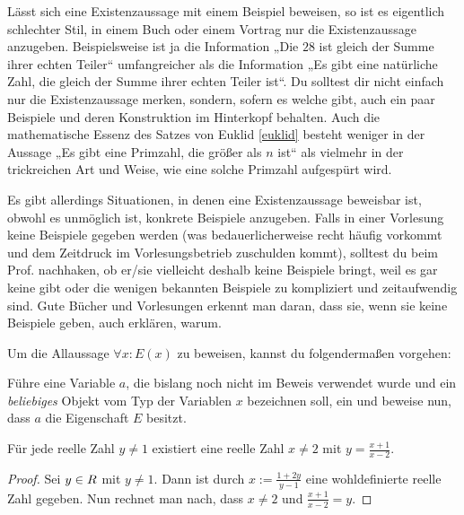   
\begin{bem}
    Lässt sich eine Existenzaussage mit einem Beispiel beweisen, so ist es eigentlich schlechter Stil, in einem Buch oder einem Vortrag nur die Existenzaussage anzugeben. Beispielsweise ist ja die Information „Die $28$ ist gleich der Summe ihrer echten Teiler“ umfangreicher als die Information „Es gibt eine natürliche Zahl, die gleich der Summe ihrer echten Teiler ist“. Du solltest dir nicht einfach nur die Existenzaussage merken, sondern, sofern es welche gibt, auch ein paar Beispiele und deren Konstruktion im Hinterkopf behalten. Auch die mathematische Essenz des Satzes von Euklid \cref{euklid} besteht weniger in der Aussage „Es gibt eine Primzahl, die größer als $n$ ist“ als vielmehr in der trickreichen Art und Weise, wie eine solche Primzahl aufgespürt wird.
    
    Es gibt allerdings Situationen, in denen eine Existenzaussage beweisbar ist, obwohl es unmöglich ist, konkrete Beispiele anzugeben. Falls in einer Vorlesung keine Beispiele gegeben werden (was bedauerlicherweise recht häufig vorkommt und dem Zeitdruck im Vorlesungsbetrieb zuschulden kommt), solltest du beim Prof. nachhaken, ob er/sie vielleicht deshalb keine Beispiele bringt, weil es gar keine gibt oder die wenigen bekannten Beispiele zu kompliziert und zeitaufwendig sind. Gute Bücher und Vorlesungen erkennt man daran, dass sie, wenn sie keine Beispiele geben, auch erklären, warum.
\end{bem}


\begin{axiom}\label{allbeweis} 
    Um die Allaussage $\forall x: E(x)$ zu beweisen, kannst du folgendermaßen vorgehen:
    
    Führe eine Variable $a$, die bislang noch nicht im Beweis verwendet wurde und ein \emph{beliebiges} Objekt vom Typ der Variablen $x$ bezeichnen soll, ein und beweise nun, dass $a$ die Eigenschaft $E$ besitzt.
\end{axiom}


\begin{bsp} \label{bsp:allbeweis}
    Für jede reelle Zahl $y\neq 1$ existiert eine reelle Zahl $x\neq 2$ mit $y=\frac{x+1}{x-2}$.
\end{bsp}
\begin{proof}
    Sei $y\in \relax R$ mit $y\neq 1$. Dann ist durch $x:= \frac{1+2y}{y-1}$ eine wohldefinierte reelle Zahl gegeben. Nun rechnet man nach, dass $x\neq 2$ und $\frac{x+1}{x-2}=y$.
\end{proof}

